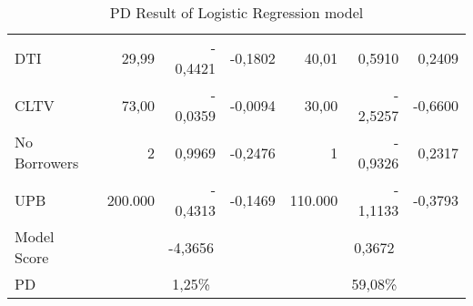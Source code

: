 \begin{table}[H]
\begin{tabular}{l|rrr|rrr}
\multicolumn{1}{l|}{DTI}               & 29,99                                                                                 & -           0,4421                                                                  & \multicolumn{1}{r|}{-0,1802}        & 40,01                                                                                 & 0,5910                                                                              & 0,2409                             \\
\multicolumn{1}{l|}{CLTV}              & 73,00                                                                                 & -           0,0359                                                                  & \multicolumn{1}{r|}{-0,0094}        & 30,00                                                                                 & -           2,5257                                                                  & -0,6600                            \\
\multicolumn{1}{l|}{No Borrowers}      & 2                                                                                     & 0,9969                                                                              & \multicolumn{1}{r|}{-0,2476}        & 1                                                                                     & -           0,9326                                                                  & 0,2317                             \\
\multicolumn{1}{l|}{UPB}               & 200.000                                                                               & -           0,4313                                                                  & \multicolumn{1}{r|}{-0,1469}        & 110.000                                                                               & -           1,1133                                                                  & -0,3793                            \\
\multicolumn{1}{l|}{Model Score}       & \multicolumn{3}{c|}{-4,3656}                                                                                                                                                                                      & \multicolumn{3}{c}{0,3672}                                                                                                                                                                                       \\
\multicolumn{1}{l|}{PD}                & \multicolumn{3}{c|}{1,25\%}                                                                                                                                                                                       & \multicolumn{3}{c}{59,08\%} \\\bottomrule                                                                                                                                                                                     
\end{tabular}
\caption{PD Result of Logistic Regression model}
\label{tab:re_PDres}
\end{table}

